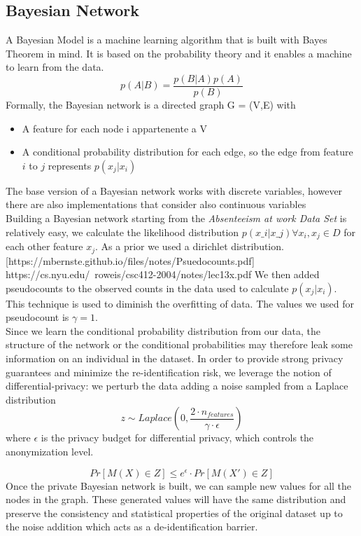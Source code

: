 \subsection{Bayesian Network}
A Bayesian Model is a machine learning algorithm that is built with Bayes Theorem in mind.  It is based on the probability theory and it enables a machine to learn from the data.
\begin{equation}
    p(A|B) = \frac{p(B|A)p(A)}{p(B)}
\end{equation}
Formally, the Bayesian network is a directed graph G = (V,E) with
\begin{itemize}
    \item A feature for each node i appartenente a V
    \item A conditional probability distribution for each edge, so the edge from feature $i$ to $j$ represents $p(x_j| x_i)$
  \end{itemize}
The base version of a Bayesian network works with discrete variables, however there are also implementations that consider also continuous variables \cite{chen2017learning} \\
Building a Bayesian network starting from the \textit{Absenteeism at work Data Set} is relatively easy, we calculate the likelihood distribution $p(x\_i|x\_j) \forall x_i, x_j \in D$ for each other feature $x_j$. As a prior we used a dirichlet distribution. 
[https://mbernste.github.io/files/notes/Psuedocounts.pdf]
https://cs.nyu.edu/~roweis/csc412-2004/notes/lec13x.pdf
We then added pseudocounts to the observed counts in the data used to calculate $p(x_j| x_i)$. This technique is used to diminish the overfitting of data. The values we used for pseudocount is $\gamma=1$. \\
Since we learn the conditional probability distribution from our data, the structure of the network or the conditional probabilities may therefore leak some information on an individual in the dataset. In order to provide strong privacy guarantees and minimize
the re-identification risk, we leverage the notion of differential-privacy: we perturb the data adding a noise sampled from a Laplace distribution 
\begin{equation}
    z \sim Laplace \left(0, \frac{2 \cdot n_{features}}{\gamma \cdot \epsilon} \right)
\end{equation}
where $\epsilon$ is the privacy budget for differential privacy, which controls the anonymization level.

\begin{equation}
    Pr[M(X) \in Z] \leq e^{\epsilon} \cdot Pr[M(X') \in Z]
\end{equation}
Once the private Bayesian network is built, we can sample new values for all the nodes in the graph. These generated values will have the same distribution and preserve the consistency and statistical properties of the original dataset up to the noise addition which acts as a de-identification barrier. 
